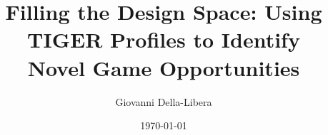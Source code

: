 \documentclass{article}
\title{Filling the Design Space: Using TIGER Profiles to Identify\\
Novel Game Opportunities}
\author{Giovanni Della-Libera}
\date{\today}
\begin{document}
\maketitle

\begin{abstract}

\end{abstract}










\end{document}
